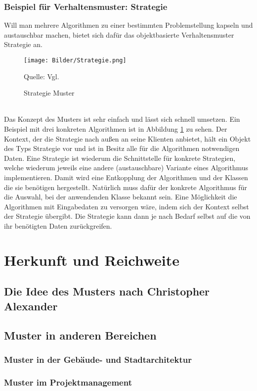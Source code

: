 \documentclass[fontsize=11pt,a4paper,final]{scrreprt}[2003/01/01]
\makeatletter
\def\ScaleIfNeeded{%
	\ifdim\Gin@nat@width>\linewidth
		\linewidth
	\else
		\Gin@nat@width
	\fi
}
\newcommand*{\quelle}{%
	\footnotesize Quelle: 
}
\makeatother
\begin{document}
\subsection{Beispiel für Verhaltensmuster: Strategie}
Will man mehrere Algorithmen zu einer bestimmten Problemstellung kapseln und austauschbar machen, bietet sich dafür das objektbasierte Verhaltensmuster Strategie an.

\begin{figure}[H]
	\centering
	\texttt{[image: Bilder/Strategie.png]}
	\caption{Strategie Muster}
	\quelle{Vgl. \cite[S. 375]{gamma2004}} 
	\label{fig:Strategie}
\end{figure}
\ \\
Das Konzept des Musters ist sehr einfach und lässt sich schnell umsetzen. Ein Beispiel mit drei konkreten Algorithmen ist in Abbildung \ref{fig:Strategie} zu sehen. Der Kontext, der die Strategie nach außen an seine Klienten anbietet, hält ein Objekt des Typs Strategie vor und ist in Besitz alle für die Algorithmen notwendigen Daten. Eine Strategie ist wiederum die Schnittstelle für konkrete Strategien, welche wiederum jeweils eine andere (austauschbare) Variante eines Algorithmus implementieren. Damit wird eine Entkopplung der Algorithmen und der Klassen die sie benötigen hergestellt. Natürlich muss dafür der konkrete Algorithmus für die Auswahl, bei der anwendenden Klasse bekannt sein. Eine Möglichkeit die Algorithmen mit Eingabedaten zu versorgen wäre, indem sich der Kontext selbst der Strategie übergibt. Die Strategie kann dann je nach Bedarf selbst auf die von ihr benötigten Daten zurückgreifen.

\chapter{Herkunft und Reichweite}\label{Muster}

\section{Die Idee des Musters nach Christopher Alexander}
\section{Muster in anderen Bereichen}
\subsection{Muster in der Gebäude- und Stadtarchitektur}
\subsection{Muster im Projektmanagement}
\end{document}
